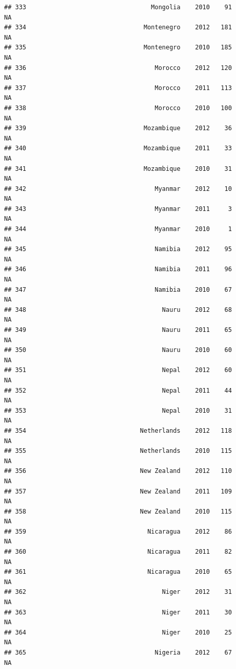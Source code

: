 \documentclass[
]{book}
\begin{document}
\begin{verbatim}
## 333                                  Mongolia    2010    91              NA
## 334                                Montenegro    2012   181              NA
## 335                                Montenegro    2010   185              NA
## 336                                   Morocco    2012   120              NA
## 337                                   Morocco    2011   113              NA
## 338                                   Morocco    2010   100              NA
## 339                                Mozambique    2012    36              NA
## 340                                Mozambique    2011    33              NA
## 341                                Mozambique    2010    31              NA
## 342                                   Myanmar    2012    10              NA
## 343                                   Myanmar    2011     3              NA
## 344                                   Myanmar    2010     1              NA
## 345                                   Namibia    2012    95              NA
## 346                                   Namibia    2011    96              NA
## 347                                   Namibia    2010    67              NA
## 348                                     Nauru    2012    68              NA
## 349                                     Nauru    2011    65              NA
## 350                                     Nauru    2010    60              NA
## 351                                     Nepal    2012    60              NA
## 352                                     Nepal    2011    44              NA
## 353                                     Nepal    2010    31              NA
## 354                               Netherlands    2012   118              NA
## 355                               Netherlands    2010   115              NA
## 356                               New Zealand    2012   110              NA
## 357                               New Zealand    2011   109              NA
## 358                               New Zealand    2010   115              NA
## 359                                 Nicaragua    2012    86              NA
## 360                                 Nicaragua    2011    82              NA
## 361                                 Nicaragua    2010    65              NA
## 362                                     Niger    2012    31              NA
## 363                                     Niger    2011    30              NA
## 364                                     Niger    2010    25              NA
## 365                                   Nigeria    2012    67              NA

\end{verbatim}
\end{document}
